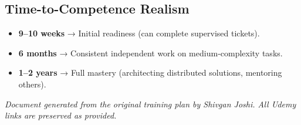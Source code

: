\documentclass[12pt]{article}
\begin{document}
	\subsection*{Time-to-Competence Realism}
	\begin{itemize}
		\item \textbf{9–10 weeks} → Initial readiness (can complete supervised tickets).
		\item \textbf{6 months} → Consistent independent work on medium‑complexity tasks.
		\item \textbf{1–2 years} → Full mastery (architecting distributed solutions, mentoring others).
	\end{itemize}
	
	\vspace{1cm}
	\noindent\textit{Document generated from the original training plan by Shivgan Joshi. All Udemy links are preserved as provided.}
	
\end{document}
